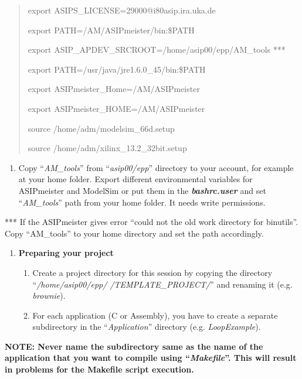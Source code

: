 \documentclass[
]{article}
\begin{document}
\begin{quote}
export ASIPS\_LICENSE=29000@i80asip.ira.uka.de

export PATH=/AM/ASIPmeister/bin:\$PATH

export ASIP\_APDEV\_SRCROOT=/home/asip00/epp/AM\_tools ***

export PATH=/usr/java/jre1.6.0\_45/bin:\$PATH

export ASIPmeister\_Home=/AM/ASIPmeister

export ASIPmeister\_HOME=/AM/ASIPmeister

source /home/adm/modelsim\_66d.setup

source /home/adm/xilinx\_13.2\_32bit.setup
\end{quote}

\begin{enumerate}
\def\labelenumi{\arabic{enumi}.}
\setcounter{enumi}{3}
\item
  Copy ``\emph{AM\_tools}'' from ``\emph{asip00/epp}'' directory to your
  account, for example at your home folder. Export different
  environmental variables for ASIPmeister and ModelSim or put them in
  the \emph{\textbf{bashrc.user}} and set ``\emph{AM\_tools}'' path from
  your home folder. It needs write permissions.
\end{enumerate}

*** If the ASIPmeister gives error ``could not the old work directory
for binutils''. Copy ``AM\_tools'' to your home directory and set the
path accordingly.

\begin{enumerate}
\def\labelenumi{\arabic{enumi}.}
\setcounter{enumi}{1}
\item
  \textbf{Preparing your project}

  \begin{enumerate}
  \def\labelenumii{\arabic{enumii}.}
  \item
    Create a project directory for this session by copying the directory
    ``\emph{/home/asip00/­epp/ /TEMPLATE\_PROJECT/}'' and renaming it
    (e.g. \emph{brownie}).
  \item
    For each application (C or Assembly), you have to create a separate
    subdirectory in the ``\emph{Application}'' directory (e.g.
    \emph{LoopExample}).
  \end{enumerate}
\end{enumerate}

\textbf{NOTE: Never name the subdirectory same as the name of the
application that you want to compile using ``\emph{Makefile}''. This
will result in problems for the Makefile script execution.}
\end{document}
